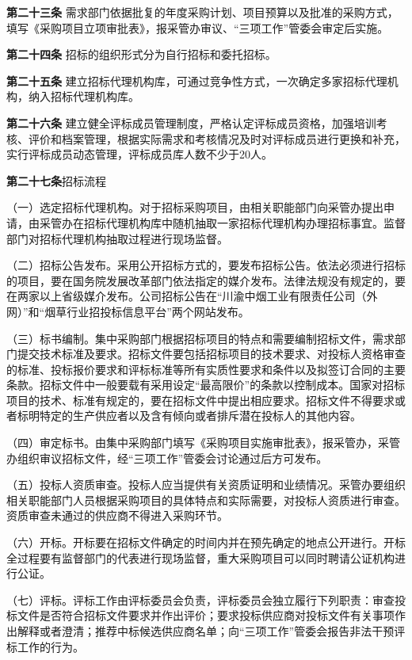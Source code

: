 \textbf{第二十三条} \quad 需求部门依据批复的年度采购计划、项目预算以及批准的采购方式，填写《采购项目立项审批表》，报采管办审议、“三项工作”管委会审定后实施。

\textbf{第二十四条 }\quad 招标的组织形式分为自行招标和委托招标。

\textbf{第二十五条 }\quad 建立招标代理机构库，可通过竞争性方式，一次确定多家招标代理机构，纳入招标代理机构库。

\textbf{第二十六条} \quad 建立健全评标成员管理制度，严格认定评标成员资格，加强培训考核、评价和档案管理，根据实际需求和考核情况及时对评标成员进行更换和补充，实行评标成员动态管理，评标成员库人数不少于20人。

\textbf{第二十七条}\quad  招标流程

（一）选定招标代理机构。对于招标采购项目，由相关职能部门向采管办提出申请，由采管办在招标代理机构库中随机抽取一家招标代理机构办理招标事宜。监督部门对招标代理机构抽取过程进行现场监督。

（二）招标公告发布。采用公开招标方式的，要发布招标公告。依法必须进行招标的项目，要在国务院发展改革部门依法指定的媒介发布。法律法规没有规定的，要在两家以上省级媒介发布。公司招标公告在“川渝中烟工业有限责任公司（外网）”和“烟草行业招投标信息平台”两个网站发布。

（三）标书编制。集中采购部门根据招标项目的特点和需要编制招标文件，需求部门提交技术标准及要求。招标文件要包括招标项目的技术要求、对投标人资格审查的标准、投标报价要求和评标标准等所有实质性要求和条件以及拟签订合同的主要条款。招标文件中一般要载有采用设定“最高限价”的条款以控制成本。国家对招标项目的技术、标准有规定的，要在招标文件中提出相应要求。招标文件不得要求或者标明特定的生产供应者以及含有倾向或者排斥潜在投标人的其他内容。

（四）审定标书。由集中采购部门填写《采购项目实施审批表》，报采管办，采管办组织审议招标文件，经“三项工作”管委会讨论通过后方可发布。

（五）投标人资质审查。投标人应当提供有关资质证明和业绩情况。采管办要组织相关职能部门人员根据采购项目的具体特点和实际需要，对投标人资质进行审查。资质审查未通过的供应商不得进入采购环节。

（六）开标。开标要在招标文件确定的时间内并在预先确定的地点公开进行。开标全过程要有监督部门的代表进行现场监督，重大采购项目可以同时聘请公证机构进行公证。

（七）评标。评标工作由评标委员会负责，评标委员会独立履行下列职责：审查投标文件是否符合招标文件要求并作出评价；要求投标供应商对投标文件有关事项作出解释或者澄清；推荐中标候选供应商名单；向“三项工作”管委会报告非法干预评标工作的行为。

